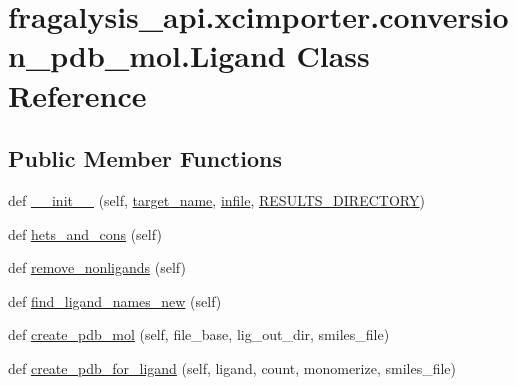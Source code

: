 \hypertarget{classfragalysis__api_1_1xcimporter_1_1conversion__pdb__mol_1_1_ligand}{}\section{fragalysis\+\_\+api.\+xcimporter.\+conversion\+\_\+pdb\+\_\+mol.\+Ligand Class Reference}
\label{classfragalysis__api_1_1xcimporter_1_1conversion__pdb__mol_1_1_ligand}
\subsection*{Public Member Functions}
\begin{DoxyCompactItemize}
\item 
def \hyperlink{classfragalysis__api_1_1xcimporter_1_1conversion__pdb__mol_1_1_ligand_a93d37150b50131f70bb890e6ec609047}{\+\_\+\+\_\+init\+\_\+\+\_\+} (self, \hyperlink{classfragalysis__api_1_1xcimporter_1_1conversion__pdb__mol_1_1_ligand_a7bacd3ad4cf07e41aed7a9f2a4ff387a}{target\+\_\+name}, \hyperlink{classfragalysis__api_1_1xcimporter_1_1conversion__pdb__mol_1_1_ligand_a32128e8047085e698f5ca00f3c5272a9}{infile}, \hyperlink{classfragalysis__api_1_1xcimporter_1_1conversion__pdb__mol_1_1_ligand_aae0e03b03bc78f6d2df7f84a6df36901}{R\+E\+S\+U\+L\+T\+S\+\_\+\+D\+I\+R\+E\+C\+T\+O\+RY})
\item 
def \hyperlink{classfragalysis__api_1_1xcimporter_1_1conversion__pdb__mol_1_1_ligand_af0d3d0b75f9f10f0f50cba06017c4ba6}{hets\+\_\+and\+\_\+cons} (self)
\item 
def \hyperlink{classfragalysis__api_1_1xcimporter_1_1conversion__pdb__mol_1_1_ligand_af21865a4bb9be6aab21bfc82668ba25e}{remove\+\_\+nonligands} (self)
\item 
def \hyperlink{classfragalysis__api_1_1xcimporter_1_1conversion__pdb__mol_1_1_ligand_aa9601289368daa83655aa849041e7b63}{find\+\_\+ligand\+\_\+names\+\_\+new} (self)
\item 
def \hyperlink{classfragalysis__api_1_1xcimporter_1_1conversion__pdb__mol_1_1_ligand_a4603fdd993d7b6b4cebea13a5ada16c2}{create\+\_\+pdb\+\_\+mol} (self, file\+\_\+base, lig\+\_\+out\+\_\+dir, smiles\+\_\+file)
\item 
def \hyperlink{classfragalysis__api_1_1xcimporter_1_1conversion__pdb__mol_1_1_ligand_ada1d85b43009efb4da6cf5b17c851783}{create\+\_\+pdb\+\_\+for\+\_\+ligand} (self, ligand, count, monomerize, smiles\+\_\+file)
\item 

\end{DoxyCompactItemize}
